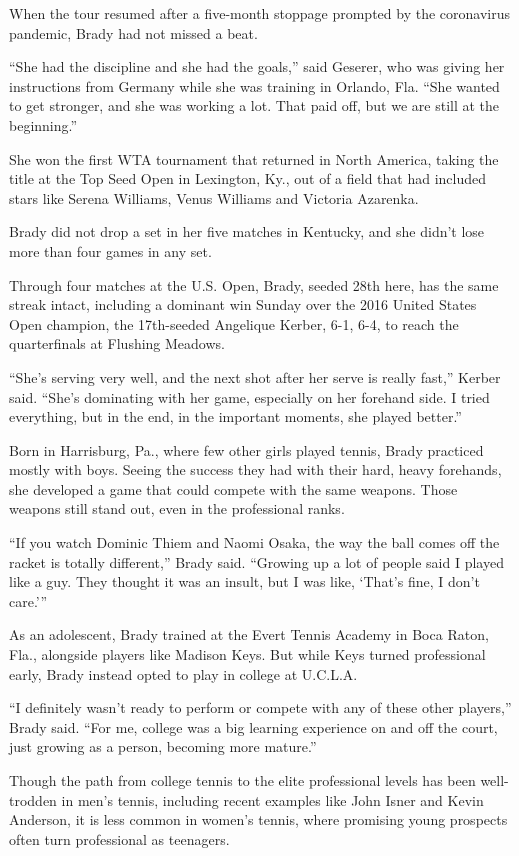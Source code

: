 When the tour resumed after a five-month stoppage prompted by the
coronavirus pandemic, Brady had not missed a beat.

``She had the discipline and she had the goals,'' said Geserer, who was
giving her instructions from Germany while she was training in Orlando,
Fla. ``She wanted to get stronger, and she was working a lot. That paid
off, but we are still at the beginning.''

She won the first WTA tournament that returned in North America, taking
the title at the Top Seed Open in Lexington, Ky., out of a field that
had included stars like Serena Williams, Venus Williams and Victoria
Azarenka.

Brady did not drop a set in her five matches in Kentucky, and she didn't
lose more than four games in any set.

Through four matches at the U.S. Open, Brady, seeded 28th here, has the
same streak intact, including a dominant win Sunday over the 2016 United
States Open champion, the 17th-seeded Angelique Kerber, 6-1, 6-4, to
reach the quarterfinals at Flushing Meadows.

``She's serving very well, and the next shot after her serve is really
fast,'' Kerber said. ``She's dominating with her game, especially on her
forehand side. I tried everything, but in the end, in the important
moments, she played better.''

Born in Harrisburg, Pa., where few other girls played tennis, Brady
practiced mostly with boys. Seeing the success they had with their hard,
heavy forehands, she developed a game that could compete with the same
weapons. Those weapons still stand out, even in the professional ranks.

``If you watch Dominic Thiem and Naomi Osaka, the way the ball comes off
the racket is totally different,'' Brady said. ``Growing up a lot of
people said I played like a guy. They thought it was an insult, but I
was like, `That's fine, I don't care.'''

As an adolescent, Brady trained at the Evert Tennis Academy in Boca
Raton, Fla., alongside players like Madison Keys. But while Keys turned
professional early, Brady instead opted to play in college at U.C.L.A.

``I definitely wasn't ready to perform or compete with any of these
other players,'' Brady said. ``For me, college was a big learning
experience on and off the court, just growing as a person, becoming more
mature.''

Though the path from college tennis to the elite professional levels has
been well-trodden in men's tennis, including recent examples like John
Isner and Kevin Anderson, it is less common in women's tennis, where
promising young prospects often turn professional as teenagers.


